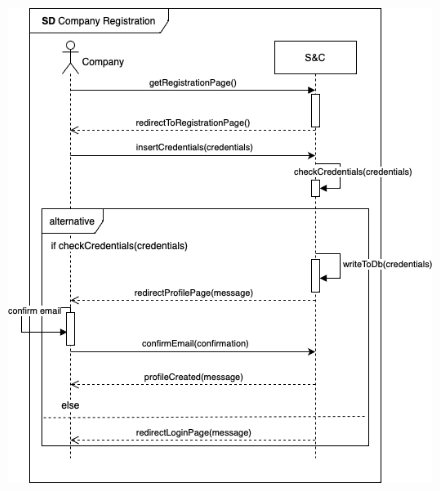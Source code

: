\begin{enumerate}[label=\textbf{[US\arabic*]}, left = 0pt, align = left, resume]
            
\newpage
            \begin{figure}[h!]
                \centering  \includegraphics[width=1\textwidth]{RASD/Images/UseCases/CompanyRegistration.drawio.png}
                \label{fig:CompanyRegistration}
                \end{figure}
\newpage
            
                
                
                

\end{enumerate}
